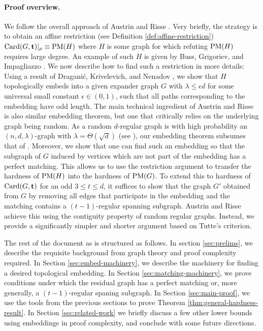 \documentclass[11pt]{article}
\begin{document}
\paragraph{Proof overview.}
We follow the overall approach of Austrin and Risse \cite{Austrin_2022}. Very briefly, the strategy is to obtain an affine restriction (see Definition \ref{def:affine-restriction}) $\text{Card}(G, \mathbf{t})|_\rho \equiv \text{PM}(H)$ where $H$ is some graph for which refuting $\text{PM}(H)$ requires large degree.
An example of such $H$ is given by Buss, Grigoriev, and Impagliazzo \cite{buss1999linear}. We now describe how to find such a restriction in more details: Using a result of Dragani\'c, Krivelevich, and Nenadov \cite{draganic22rolling}, we show that $H$ topologically embeds into a given expander graph $G$ with $\lambda \le \epsilon d$ for some universal small constant $\epsilon \in (0,1)$, such that all paths corresponding to the embedding have odd length.
The main technical ingredient of Austrin and Risse is also similar embedding theorem, but one that critically relies on the underlying graph being random.
As a random $d$-regular graph is with high probability an $(n, d, \lambda)$-graph with $\lambda = \Theta(\sqrt{d})$ (see \cite[Theorem A]{tikhomirov2016spectralgapdenserandom}), our embedding theorem subsumes that of \cite{Austrin_2022}.
Moreover, we show that one can find such an embedding so that the subgraph of $G$ induced by vertices which are not part of the embedding has a perfect matching.
This allows us to use the restriction argument to transfer the hardness of $\text{PM}(H)$ into the hardness of $\text{PM}(G)$.
To extend this to hardness of $\text{Card}(G, \mathbf{t})$ for an odd $3 \le t \leq d$, it suffices to show that the graph $G'$ obtained from $G$ by removing all edges that participate in the embedding and the matching contains a $(t-1)$-regular spanning subgraph.
Austrin and Risse achieve this using the contiguity property of random regular graphs. Instead, we provide a significantly simpler and shorter argument based on Tutte's criterion.\par
The rest of the document as is structured as follows. In section \ref{sec:prelims}, we describe the requisite background from graph theory and proof complexity required.
In Section \ref{sec:embed-machinery}, we describe the machinery for finding a desired topological embedding.
In Section \ref{sec:matching-machinery}, we prove conditions under which the residual graph has a perfect matching or, more generally, a $(t-1)$-regular spaning subgraph.
In Section \ref{sec:main-proof}, we use the tools from the previous sections to prove Theorem \ref{thm:general-hardness-result}. 
In Section \ref{sec:related-work} we briefly discuss a few other lower bounds using embeddings in proof complexity, and conclude with some future directions.
\end{document}
